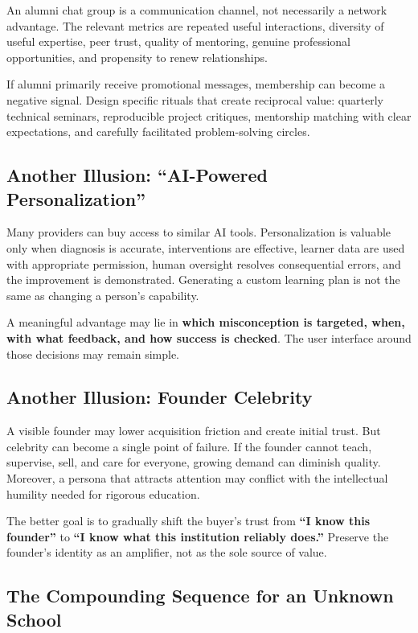 An alumni chat group is a communication channel, not necessarily a network advantage. The relevant metrics are repeated useful interactions, diversity of useful expertise, peer trust, quality of mentoring, genuine professional opportunities, and propensity to renew relationships.

If alumni primarily receive promotional messages, membership can become a negative signal. Design specific rituals that create reciprocal value: quarterly technical seminars, reproducible project critiques, mentorship matching with clear expectations, and carefully facilitated problem-solving circles.

\subsection{Another Illusion: ``AI-Powered Personalization''}
\label{sec:illusion_ai_powered_personalization}

Many providers can buy access to similar AI tools. Personalization is valuable only when diagnosis is accurate, interventions are effective, learner data are used with appropriate permission, human oversight resolves consequential errors, and the improvement is demonstrated. Generating a custom learning plan is not the same as changing a person's capability.

A meaningful advantage may lie in \textbf{which misconception is targeted, when, with what feedback, and how success is checked}. The user interface around those decisions may remain simple.

\subsection{Another Illusion: Founder Celebrity}
\label{sec:illusion_founder_celebrity}

A visible founder may lower acquisition friction and create initial trust. But celebrity can become a single point of failure. If the founder cannot teach, supervise, sell, and care for everyone, growing demand can diminish quality. Moreover, a persona that attracts attention may conflict with the intellectual humility needed for rigorous education.

The better goal is to gradually shift the buyer's trust from \textbf{``I know this founder''} to \textbf{``I know what this institution reliably does.''} Preserve the founder's identity as an amplifier, not as the sole source of value.

\subsection{The Compounding Sequence for an Unknown School}
\label{sec:compounding_sequence_unknown_school}

